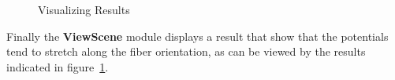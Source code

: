 \documentclass[fleqn,11pt,openany]{book}
\begin{document}
\begin{figure}
\caption{Visualizing Results}\label{fig:SimulationNetwork6}
\end{figure}

Finally the {\bf ViewScene} module displays a result that show that the potentials tend to stretch along the fiber orientation, as can be viewed by the results indicated in figure~\ref{fig:SimulationNetwork6}.
\end{document}
